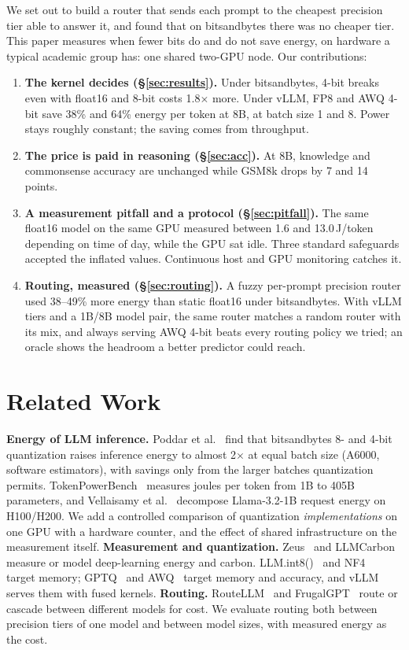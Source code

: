 \documentclass[conference]{IEEEtran}
\begin{document}
We set out to build a router that sends each prompt to the cheapest precision tier able to answer it, and found that on bitsandbytes there was no cheaper tier. This paper measures when fewer bits do and do not save energy, on hardware a typical academic group has: one shared two-GPU node. Our contributions:
\begin{enumerate}
\item \textbf{The kernel decides (§\ref{sec:results}).} Under bitsandbytes, 4-bit breaks even with float16 and 8-bit costs 1.8$\times$ more. Under vLLM, FP8 and AWQ 4-bit save 38\% and 64\% energy per token at 8B, at batch size 1 and 8. Power stays roughly constant; the saving comes from throughput.
\item \textbf{The price is paid in reasoning (§\ref{sec:acc}).} At 8B, knowledge and commonsense accuracy are unchanged while GSM8k drops by 7 and 14 points.
\item \textbf{A measurement pitfall and a protocol (§\ref{sec:pitfall}).} The same float16 model on the same GPU measured between 1.6 and 13.0\,J/token depending on time of day, while the GPU sat idle. Three standard safeguards accepted the inflated values. Continuous host and GPU monitoring catches it.
\item \textbf{Routing, measured (§\ref{sec:routing}).} A fuzzy per-prompt precision router used 38--49\% more energy than static float16 under bitsandbytes. With vLLM tiers and a 1B/8B model pair, the same router matches a random router with its mix, and always serving AWQ 4-bit beats every routing policy we tried; an oracle shows the headroom a better predictor could reach.
\end{enumerate}

\section{Related Work}
\textbf{Energy of LLM inference.} Poddar et al.~\cite{poddar2025} find that bitsandbytes 8- and 4-bit quantization raises inference energy to almost 2$\times$ at equal batch size (A6000, software estimators), with savings only from the larger batches quantization permits. TokenPowerBench~\cite{niu2026tokenpower} measures joules per token from 1B to 405B parameters, and Vellaisamy et al.~\cite{vellaisamy2026} decompose Llama-3.2-1B request energy on H100/H200. We add a controlled comparison of quantization \emph{implementations} on one GPU with a hardware counter, and the effect of shared infrastructure on the measurement itself.
\textbf{Measurement and quantization.} Zeus~\cite{you2023zeus} and LLMCarbon~\cite{faiz2024llmcarbon} measure or model deep-learning energy and carbon. LLM.int8()~\cite{dettmers2022int8} and NF4~\cite{dettmers2023qlora} target memory; GPTQ~\cite{frantar2023gptq} and AWQ~\cite{lin2024awq} target memory and accuracy, and vLLM~\cite{kwon2023vllm} serves them with fused kernels.
\textbf{Routing.} RouteLLM~\cite{ong2024routellm} and FrugalGPT~\cite{chen2023frugalgpt} route or cascade between different models for cost. We evaluate routing both between precision tiers of one model and between model sizes, with measured energy as the cost.
\end{document}
